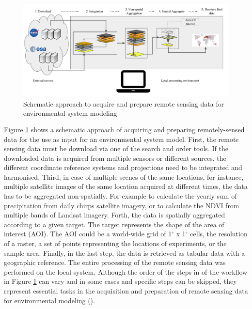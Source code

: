 \begin{center}
	\begin{figure}[h]
		\begin{center}
			\includegraphics[width=15cm]{images/traditional_acquisition-cropped.pdf}
			\caption{Schematic approach to acquire and prepare remote sensing data for environmental system modeling}
			\label{traditionl_approach}
		\end{center}
	\end{figure}
\end{center}


Figure \ref{traditionl_approach} shows a schematic approach of acquiring and preparing remotely-sensed data for the use as input for an environmental system model.
First, the remote sensing data must be download via one of the search and order tools. If the downloaded data is acquired from multiple sensors or different sources, the different coordinate reference systems and projections need to be integrated and harmonised. Third, in case of multiple scenes of the same locations, for instance, multiple satellite images of the same location acquired at different times, the data has to be aggregated non-spatially. For example to calculate the yearly sum of precipitation from daily chirps satellite imagery, or to calculate the NDVI from multiple bands of Landsat imagery.
Forth, the data is spatially aggregated according to a given target. The target represents the shape of the area of interest (AOI). The AOI could be a world-wide grid of 1$^\circ$ x 1$^\circ$ cells, the resolution of a raster, a set of points representing the locations of experiments, or the sample area. Finally, in the last step, the data is retrieved as tabular data with a geographic reference. The entire processing of the remote sensing data was performed on the local system.
Although the order of the steps in of the workflow in Figure \ref{traditionl_approach} can vary and in some cases and specific steps can be skipped, they represent essential tasks in the acquisition and preparation of remote sensing data for environmental modeling (\cite{iosifescu2011geovite}).

